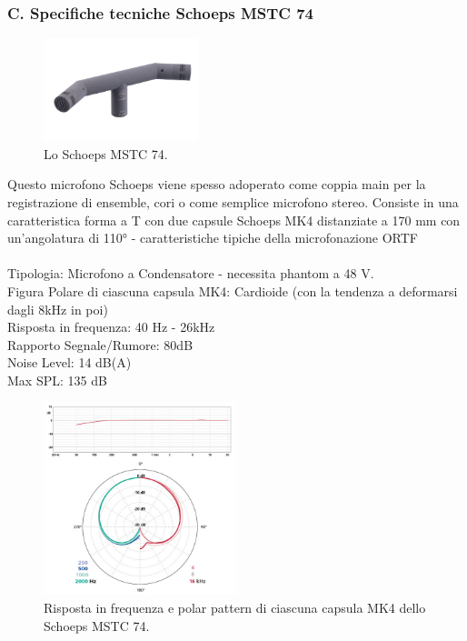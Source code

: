 \documentclass{article}
\begin{document}
\subsubsection{C. Specifiche tecniche Schoeps MSTC 74}
    \begin{figure}[H]
        \centering
        \includegraphics[width=0.4\textwidth]{images/MSTC74.jpeg}
        \caption{\label{fig6}Lo Schoeps MSTC 74.}
    \end{figure}
    
    Questo microfono Schoeps viene spesso adoperato come coppia main per la registrazione di ensemble, cori o come semplice microfono stereo. Consiste in una caratteristica forma a T con due capsule Schoeps MK4 distanziate a 170 mm con un'angolatura di 110° - caratteristiche tipiche della microfonazione ORTF\\\\
    Tipologia: Microfono a Condensatore - necessita phantom a 48 V.\\
    Figura Polare di ciascuna capsula MK4: Cardioide (con la tendenza a deformarsi dagli 8kHz in poi)\\
    Risposta in frequenza: 40 Hz - 26kHz\\
    Rapporto Segnale/Rumore: 80dB\\
    Noise Level: 14 dB(A)\\
    Max SPL: 135 dB
    
    \begin{figure}[H]
        \centering
        \includegraphics[width=0.5\textwidth]{images/PLOT_SCHOEPS.jpg}
        \caption{\label{fig7}Risposta in frequenza e polar pattern di ciascuna capsula MK4 dello Schoeps MSTC 74.}
    \end{figure}
\endsubsubsection
\end{document}
